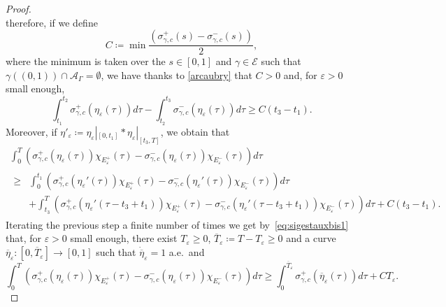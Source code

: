 \documentclass[11pt,a4paper,american]{article}
\newcommand{\Acal}{\mathcal A}
\newcommand{\Ecal}{\mathcal E}
\newcommand{\ovT}{\overline T}
\newcommand{\oveta}{\overline\eta}
\begin{document}
\begin{proof}
\begin{equation*}
        \end{equation*}
        therefore, if we define
        \begin{equation*}
            C\coloneqq\min\frac{\left(\sigma_{\gamma,c}^+(s)-\sigma_{\gamma,c}^-(s)\right)}2,
        \end{equation*}
        where the minimum is taken over the $s\in[0,1]$ and $\gamma\in\Ecal$ such that $\gamma((0,1))\cap\Acal_\Gamma=\emptyset$, we have thanks to \cref{arcaubry} that $C>0$ and, for $\varepsilon>0$ small enough,
        \begin{equation*}
            \int_{t_1}^{t_2}\sigma_{\gamma,c}^+(\eta_\varepsilon(\tau))d\tau-\int_{t_2}^{t_3}\sigma_{\gamma,c}^-(\eta_\varepsilon(\tau))d\tau\ge C(t_3-t_1).
        \end{equation*}
        Moreover, if $\eta'_\varepsilon\coloneqq\eta_\varepsilon|_{[0,t_1]}*\eta_\varepsilon|_{[t_3,T]}$, we obtain that
        \begin{multline*}
            \int_0^T\left(\sigma_{\gamma,c}^+(\eta_\varepsilon(\tau))\chi_{E_\varepsilon^+}(\tau)-\sigma_{\gamma,c}^-(\eta_\varepsilon(\tau))\chi_{E_\varepsilon^-}(\tau)\right)d\tau\\
            \begin{aligned}
                \ge&\int_0^{t_1}\left(\sigma_{\gamma,c}^+\left(\eta_\varepsilon'(\tau)\right)\chi_{E_\varepsilon^+}(\tau)-\sigma_{\gamma,c}^-\left(\eta_\varepsilon'(\tau)\right)\chi_{E_\varepsilon^-}(\tau)\right)d\tau\\
                &+\int_{t_3}^T\left(\sigma_{\gamma,c}^+\left(\eta_\varepsilon'(\tau-t_3+t_1)\right)\chi_{E_\varepsilon^+}(\tau)-\sigma_{\gamma,c}^-\left(\eta_\varepsilon'(\tau-t_3+t_1)\right)\chi_{E_\varepsilon^-}(\tau)\right)d\tau+C(t_3-t_1).
            \end{aligned}
        \end{multline*}
        Iterating the previous step a finite number of times we get by~\cref{eq:sigestauxbis1} that, for $\varepsilon>0$ small enough, there exist $T_\varepsilon\ge0$, $\ovT_\varepsilon\coloneqq T-T_\varepsilon\ge0$ and a curve $\oveta_\varepsilon:\left[0,\ovT_\varepsilon\right]\to[0,1]$ such that $\dot\oveta_\varepsilon=1$ a.e.\ and
        \begin{equation}\label{eq:sigestauxbis4}
            \int_0^T\left(\sigma_{\gamma,c}^+(\eta_\varepsilon(\tau))\chi_{E^+_\varepsilon}(\tau)-\sigma_{\gamma,c}^-(\eta_\varepsilon(\tau))\chi_{E^-_\varepsilon}(\tau)\right)d\tau\ge\int_0^{\ovT_\varepsilon}\sigma_{\gamma,c}^+(\oveta_\varepsilon(\tau))d\tau+CT_\varepsilon.

\end{equation}
\end{proof}
\end{document}
